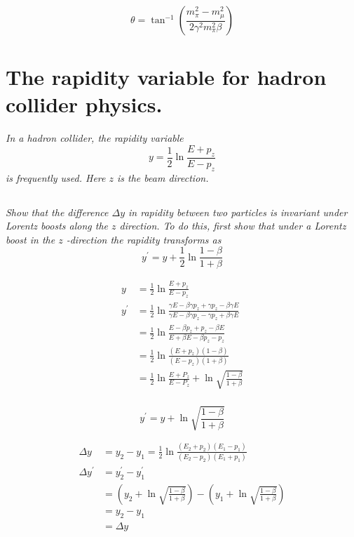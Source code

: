 \documentclass{article}
\begin{document}
$$\boxed{\theta=\tan ^{-1}\left(\frac{m_{\pi}^{2}-m_{\mu}^{2}}{2 \gamma^{2} m_{\pi}^{2} \beta}\right)}$$

\newpage


\section{The rapidity variable for hadron collider physics.}
\textit{In a hadron collider, the rapidity variable
$$
y=\frac{1}{2} \ln \frac{E+p_{z}}{E-p_{z}}
$$
is frequently used. Here $z$ is the beam direction.}


\subsection{}
\textit{Show that the difference $\Delta y$ in rapidity between two particles is invariant under Lorentz boosts along the $z$ direction. To do this, first show that under a Lorentz boost in the $z$ -direction the rapidity transforms as
$$
y^{\prime}=y+\frac{1}{2} \ln \frac{1-\beta}{1+\beta}
$$}

\begin{align*}
    y&=\frac{1}{2} \ln \frac{E+p_{z}}{E-p_{z}}\\
    y^{\prime}&= \frac{1}{2} \ln \frac{\gamma E-\beta \gamma p_z+\gamma p_{z}-\beta \gamma E}{\gamma E-\beta \gamma p_{z}-\gamma p_{z}+\beta \gamma E}\\
    &= \frac{1}{2} \ln \frac{E-\beta p_{z}+p_{z}-\beta E}{E+\beta E-\beta p_{z}-p_{z}}\\
    &= \frac{1}{2} \ln \frac{\left(E+p_{z}\right)(1-\beta)}{\left(E-p_{z}\right)(1+\beta)}\\
    &= \frac{1}{2} \ln \frac{E+P_{z}}{E-P_{z}}+\ln \sqrt{\frac{1-\beta}{1+\beta}}\\
\end{align*}

$$\boxed{y^{\prime}=y+\ln \sqrt{\frac{1-\beta}{1+\beta}}}$$


\begin{align*}
    \Delta y&=y_{2}-y_{1}=\frac{1}{2} \ln \frac{\left(E_{2}+p_{2}\right)\left(E_{1}-p_{1}\right)}{\left(E_{2}-p_{2}\right)\left(E_{1}+p_{1}\right)}\\
    \Delta y^\prime&=y^\prime_{2}-y^\prime_{1}\\
    &= \left(y_{2}+\ln \sqrt{\frac{1-\beta}{1+\beta}}\right)-\left(y_1+\ln \sqrt{\frac{1-\beta}{1+\beta}}\right)\\
    &=y_{2}-y_{1}\\
    &= \Delta y
\end{align*}
\end{document}
